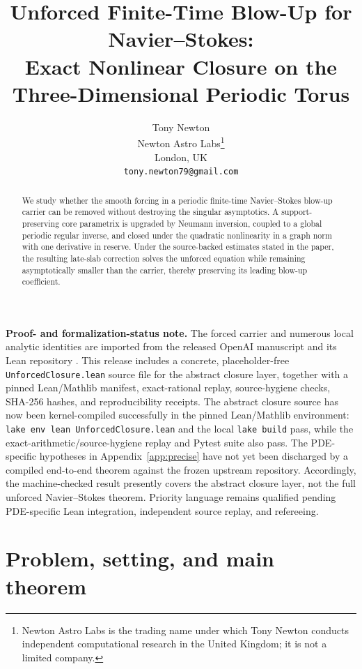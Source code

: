 \documentclass[11pt]{article}
\title{\textbf{Unforced Finite-Time Blow-Up for Navier--Stokes:}\\[0.2em]\textbf{Exact Nonlinear Closure on the Three-Dimensional Periodic Torus}}
\author{Tony Newton\\Newton Astro Labs\thanks{Newton Astro Labs is the trading name under which Tony Newton conducts independent computational research in the United Kingdom; it is not a limited company.}\\London, UK\\\texttt{tony.newton79@gmail.com}}
\date{}
\numberwithin{equation}{section}
\begin{document}
\maketitle

\begin{abstract}
We study whether the smooth forcing in a periodic finite-time Navier--Stokes blow-up carrier can be removed without destroying the singular asymptotics.  A support-preserving core parametrix is upgraded by Neumann inversion, coupled to a global periodic regular inverse, and closed under the quadratic nonlinearity in a graph norm with one derivative in reserve.  Under the source-backed estimates stated in the paper, the resulting late-slab correction solves the unforced equation while remaining asymptotically smaller than the carrier, thereby preserving its leading blow-up coefficient.
\end{abstract}

\noindent\textbf{Proof- and formalization-status note.}
The forced carrier and numerous local analytic identities are imported from the released OpenAI manuscript and its Lean repository \cite{OpenAI2026NS,OpenAIRepo2026}.  This release includes a concrete, placeholder-free \texttt{UnforcedClosure.lean} source file for the abstract closure layer, together with a pinned Lean/Mathlib manifest, exact-rational replay, source-hygiene checks, SHA-256 hashes, and reproducibility receipts.  The abstract closure source has now been kernel-compiled successfully in the pinned Lean/Mathlib environment: \texttt{lake env lean UnforcedClosure.lean} and the local \texttt{lake build} pass, while the exact-arithmetic/source-hygiene replay and Pytest suite also pass.  The PDE-specific hypotheses in Appendix~\ref{app:precise} have not yet been discharged by a compiled end-to-end theorem against the frozen upstream repository.  Accordingly, the machine-checked result presently covers the abstract closure layer, not the full unforced Navier--Stokes theorem.  Priority language remains qualified pending PDE-specific Lean integration, independent source replay, and refereeing.

\tableofcontents

\section{Problem, setting, and main theorem}
\end{document}
